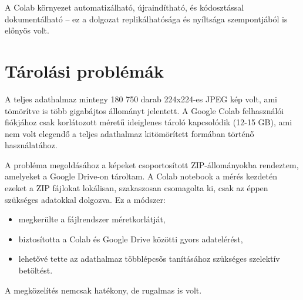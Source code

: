         A Colab környezet automatizálható, újraindítható, és kódosztással dokumentálható – ez a dolgozat replikálhatósága és nyíltsága szempontjából is előnyös volt.

    \section{Tárolási problémák}
        A teljes adathalmaz mintegy 180 750 darab 224x224-es JPEG kép volt, ami tömörítve is több gigabájtos állományt jelentett. A Google Colab felhasználói fiókjához csak korlátozott méretű ideiglenes tároló kapcsolódik (12-15 GB), ami nem volt elegendő a teljes adathalmaz kitömörített formában történő használatához.

        A probléma megoldásához a képeket csoportosított ZIP-állományokba rendeztem, amelyeket a Google Drive-on tároltam. A Colab notebook a mérés kezdetén ezeket a ZIP fájlokat lokálisan, szakaszosan csomagolta ki, csak az éppen szükséges adatokkal dolgozva. Ez a módszer:
        \begin{itemize}
            \item megkerülte a fájlrendszer méretkorlátját,
        
            \item biztosította a Colab és Google Drive közötti gyors adatelérést,
        
            \item lehetővé tette az adathalmaz többlépcsős tanításához szükséges szelektív betöltést.
        \end{itemize}
        A megközelítés nemcsak hatékony, de rugalmas is volt.


